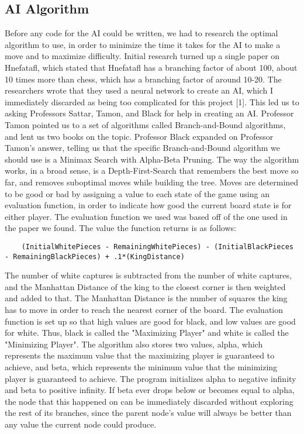 \documentclass{article}
\begin{document}
\subsection{AI Algorithm}
	Before any code for the AI could be written, we had to research the optimal algorithm to use, in order to minimize the time it takes for the AI to make a move and to maximize difficulty. Initial research turned up a single paper on Hnefatafl, which stated that Hnefatafl has a branching factor of about 100, about 10 times more than chess, which has a branching factor of around 10-20. The researchers wrote that they used a neural network to create an AI, which I immediately discarded as being too complicated for this project [1]. This led us to asking Professors Sattar, Tamon, and Black for help in creating an AI. Professor Tamon pointed us to a set of algorithms called Branch-and-Bound algorithms, and lent us two books on the topic. Professor Black expanded on Professor Tamon's answer, telling us that the specific Branch-and-Bound algorithm we should use is a Minimax Search with Alpha-Beta Pruning. 
	The way the algorithm works, in a broad sense, is a Depth-First-Search that remembers the best move so far, and removes suboptimal moves while building the tree. Moves are determined to be good or bad by assigning a value to each state of the game using an evaluation function, in order to indicate how good the current board state is for either player. The evaluation function we used was based off of the one used in the paper we found. The value the function returns is as follows:
\begin{lstlisting}
	(InitialWhitePieces - RemainingWhitePieces) - (InitialBlackPieces - RemainingBlackPieces) + .1*(KingDistance)
\end{lstlisting}
The number of white captures is subtracted from the number of white captures, and the Manhattan Distance of the king to the closest corner is then weighted and added to that. The Manhattan Distance is the number of squares the king has to move in order to reach the nearest corner of the board. The evaluation function is set up so that high values are good for black, and low values are good for white. Thus, black is called the "Maximizing Player" and white is called the "Minimizing Player". The algorithm also stores two values, alpha, which represents the maximum value that the maximizing player is guaranteed to achieve, and beta, which represents the minimum value that the minimizing player is guaranteed to achieve. The program initializes alpha to negative infinity and beta to positive infinity. If beta ever drops below or becomes equal to alpha, the node that this happened on can be immediately discarded without exploring the rest of its branches, since the parent node's value will always be better than any value the current node could produce. 
\end{document}
